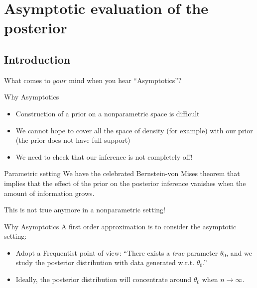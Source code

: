 
\section{Asymptotic evaluation of the posterior}

\subsection{Introduction}

\begin{frame}{What comes to $your$ mind when you hear ``Asymptotics''?}
\end{frame}


\begin{frame}{Why Asymptotics}
\begin{itemize}[<+->]
\item Construction of a prior on a nonparametric space is difficult
\item We cannot hope to cover all the space of density (for example) with our prior (the prior does not have full support)
\item \alert{We need to check that our inference is not completely off! }
\end{itemize}
 \pause 
\begin{block}{Parametric setting}
We have the celebrated \alert{Bernstein-von Mises} theorem that implies that the effect of the prior on the posterior inference vanishes when the amount of information grows. 
\end{block}
\begin{center}
\alert{This is not true anymore in a nonparametric setting! }
\end{center}
\end{frame}

\begin{frame}{Why Asymptotics}
A first order approximation is to consider the asymptotic setting:
\pause
\begin{itemize}[<+->]
\item Adopt a Frequentist point of view: ``There exists a \emph{true} parameter $\theta_0$, and we study the posterior distribution with data generated w.r.t. $\theta_0$.'' 
\item Ideally, the posterior distribution will \alert{concentrate} around $\theta_0$ when $n\to \infty$.
\end{itemize}
\end{frame}



